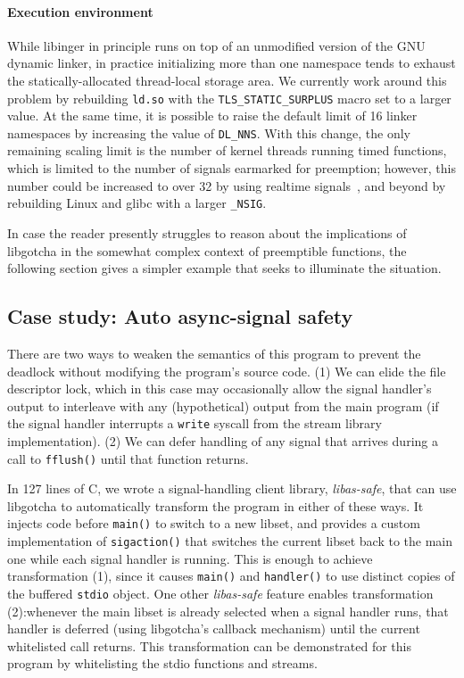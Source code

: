 \paragraph{Execution environment}

While libinger in principle runs on top of an unmodified version of the GNU dynamic
linker, in practice initializing more than one namespace tends to exhaust the
statically-allocated thread-local storage area.  We currently work around this
problem by rebuilding \texttt{ld.so} with the \texttt{TLS\_STATIC\_SURPLUS} macro set
to a larger value.  At the same time, it is possible to raise the default limit
of 16 linker namespaces by increasing the value of \texttt{DL\_NNS}.  With this
change, the only remaining scaling limit is the number of kernel threads running
timed functions, which is limited to the number of signals earmarked for preemption;
however, this number could be increased to over 32 by using realtime
signals~\cite{signal-manpage}, and beyond by rebuilding Linux and glibc with a larger
\texttt{\_NSIG}.

\vspace{\parsep}
In case the reader presently struggles to reason about the implications of libgotcha
in the somewhat complex context of preemptible functions, the following section gives
a simpler example that seeks to illuminate the situation.

\subsection{Case study: Auto async-signal safety}
\label{sec:statefulness}

There are two ways to weaken the semantics of this program to prevent the deadlock
without modifying the program's source code.  (1) We can elide the file descriptor
lock, which in this case may occasionally allow the signal handler's output to
interleave with any (hypothetical) output from the main program (if the signal
handler interrupts a \texttt{write} syscall from the stream library implementation).
(2) We can defer handling of any signal that arrives during a call to
\texttt{fflush()} until that function returns.

In 127 lines of C, we wrote a signal-handling client library, \textit{libas-safe},
that can use libgotcha to automatically transform the program in either of these
ways.  It
injects code before \texttt{main()} to switch to a new libset, and provides a custom
implementation of \texttt{sigaction()} that switches the current libset back to the
main one while each signal handler is running.  This is enough to achieve
transformation (1), since it causes \texttt{main()} and \texttt{handler()} to use
distinct copies of the buffered \texttt{stdio} object.  One other \textit{libas-safe}
feature enables transformation (2):\@ whenever the main libset is already selected
when a signal handler runs, that handler is deferred (using libgotcha's callback
mechanism) until the current whitelisted call returns.  This transformation can be
demonstrated for this program by whitelisting the stdio functions and streams.

